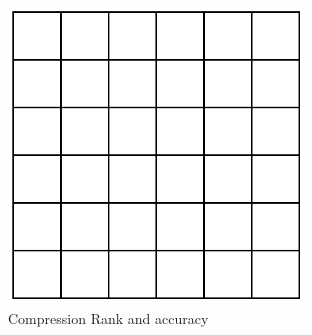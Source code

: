 \documentclass{IEEEcsmag}
\begin{document}
\begin{figure}
	\centerline{\includegraphics[width=18.5pc]{figures/interaction_lists.pdf}}
	\caption{Compression Rank and accuracy}
\end{figure}
\end{document}
